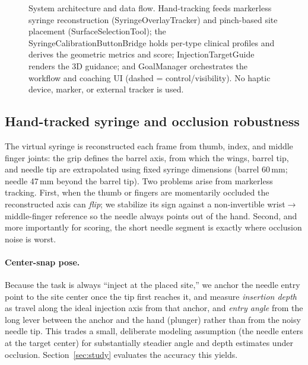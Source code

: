 \documentclass[sigconf]{acmart}
\begin{document}
\begin{figure}[t]
  \caption{System architecture and data flow. Hand-tracking feeds markerless syringe reconstruction
  (\textsf{SyringeOverlayTracker}) and pinch-based site placement (\textsf{SurfaceSelectionTool});
  the \textsf{SyringeCalibrationButtonBridge} holds per-type clinical profiles and derives the
  geometric metrics and score; \textsf{InjectionTargetGuide} renders the 3D guidance; and
  \textsf{GoalManager} orchestrates the workflow and coaching UI (dashed = control/visibility).
  No haptic device, marker, or external tracker is used.}
  \label{fig:arch}
\end{figure}

\subsection{Hand-tracked syringe and occlusion robustness}
The virtual syringe is reconstructed each frame from thumb, index, and middle finger joints: the
grip defines the barrel axis, from which the wings, barrel tip, and needle tip are extrapolated
using fixed syringe dimensions (barrel 60\,mm; needle 47\,mm beyond the barrel tip). Two problems
arise from markerless tracking. First, when the thumb or fingers are momentarily occluded the
reconstructed axis can \emph{flip}; we stabilize its sign against a non-invertible
wrist$\rightarrow$middle-finger reference so the needle always points out of the hand. Second, and
more importantly for scoring, the short needle segment is exactly where occlusion noise is worst.

\paragraph{Center-snap pose.} Because the task is always ``inject at the placed site,'' we anchor
the needle entry point to the site center once the tip first reaches it, and measure
\emph{insertion depth} as travel along the ideal injection axis from that anchor, and \emph{entry
angle} from the long lever between the anchor and the hand (plunger) rather than from the noisy
needle tip. This trades a small, deliberate modeling assumption (the needle enters at the target
center) for substantially steadier angle and depth estimates under occlusion. Section~\ref{sec:study}
evaluates the accuracy this yields.
\end{document}
